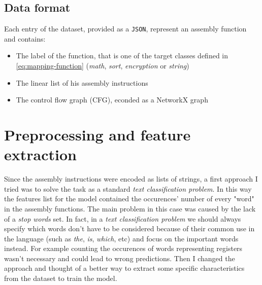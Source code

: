 \documentclass[11pt]{article}
\begin{document}
	\subsection{Data format}
	Each entry of the dataset, provided as a \texttt{JSON}, represent an assembly
	function and contains:
	\begin{itemize}
		\item The label of the function, that is one of the target classes defined
		in \autoref{eq:mapping-function} (\textit{math}, \textit{sort}, \textit{encryption} or \textit{string})
		\item The linear list of his assembly instructions
		\item The control flow graph (CFG), econded as a NetworkX graph
	\end{itemize}



	\section{Preprocessing and feature extraction} \label{subsec:feature-extraction}
	Since the assembly instructions were encoded as lists of strings, a first
	approach I tried was to solve the task as a standard \textit{text classification
	problem}. In this way the features list for the model contained the 
	occurences' number of every "word" in the assembly functions.
	The main problem in this case was caused by the lack of a \textit{stop words}
	set. In fact, in a \textit{text classification problem} we should always
	specify which words don't have to be considered because of their common use
	in the language (such as \textit{the}, \textit{is}, \textit{which}, etc) and
	focus on the important words instead.
	For example counting the occurences of words representing registers wasn't
	necessary and could lead to wrong predictions.
	Then I changed the approach and thought of a better way to extract some specific
	characteristics from the dataset to train the model.
\end{document}

